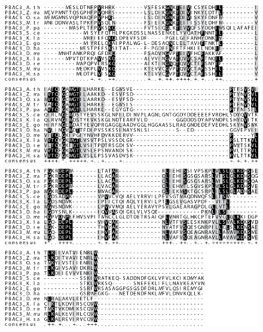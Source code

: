 \clearpage
\begin{figure}[ht]
	\centering
	\includegraphics[width=\columnwidth]{Proteasome/pbac3align1.png}
	{}
	\label{fig:pbac3align}
\end{figure}

